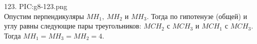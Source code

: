 123. {{PIC:g8-123.png}}\\
Опустим перпендикуляры $MH_1,\ MH_2$ и $MH_3.$ Тогда по гипотенузе (общей) и углу равны следующие пары треугольников: $MCH_2$ с $MCH_3$ и $MCH_1$ с $MCH_3.$ Тогда $MH_1=MH_3=MH_2=4.$\newpage\noindent
